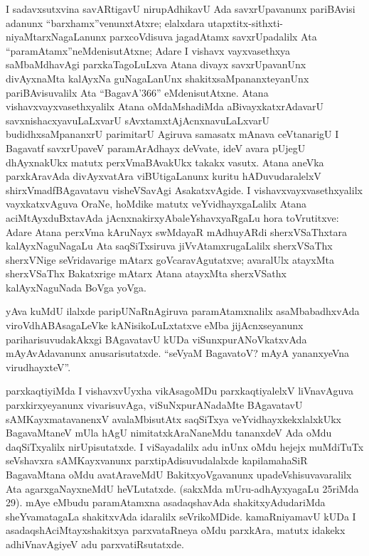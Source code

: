 I sadavxsutxvina savARtigavU nirupAdhikavU Ada savxrUpavanunx pariBAvisi adanunx ``barxhamx''venunxtAtxre; elalxdara utapxtitx-sithxti-niyaMtarxNagaLanunx parxcoVdisuva jagadAtamx savxrUpadalilx Ata ``paramAtamx''neMdenisutAtxne; Adare I vishavx vayxvasethxya saMbaMdhavAgi parxkaTagoLuLxva Atana divayx savxrUpavanUnx divAyxnaMta kalAyxNa guNagaLanUnx shakitxsaMpananxteyanUnx pariBAvisuvalilx Ata ``BagavA\char'366'' eMdenisutAtxne. Atana vishavxvayxvasethxyalilx Atana oMdaMshadiMda aBivayxkatxrAdavarU savxnishacxyavuLaLxvarU sAvxtamxtAjAcnxnavuLaLxvarU budidhxsaMpananxrU parimitarU Agiruva samasatx mAnava ceVtanarigU I Bagavatf savxrUpaveV paramArAdhayx deVvate, ideV avara pUjegU dhAyxnakUkx matutx perxVmaBAvakUkx takakx vasutx. Atana aneVka parxkAravAda divAyxvatAra viBUtigaLanunx kuritu hADuvudaralelxV shirxVmadfBAgavatavu visheVSavAgi AsakatxvAgide. I vishavxvayxvasethxyalilx vayxkatxvAguva OraNe, hoMdike matutx veYvidhayxgaLalilx Atana aciMtAyxduBxtavAda jAcnxnakirxyAbaleYshavxyaRgaLu hora toVrutitxve: Adare Atana perxVma kAruNayx swMdayaR mAdhuyARdi sherxVSaThxtara kalAyxNaguNagaLu Ata saqSiTxsiruva jiVvAtamxrugaLalilx sherxVSaThx sherxVNige seVridavarige mAtarx goVcaravAgutatxve; avaralUlx atayxMta sherxVSaThx Bakatxrige mAtarx Atana atayxMta sherxVSathx kalAyxNaguNada BoVga yoVga.

yAva kuMdU ilalxde paripUNaRnAgiruva paramAtamxnalilx asaMbabadhxvAda viroVdhABAsagaLeVke kANisikoLuLxtatxve eMba jijAcnxseyanunx pariharisuvudakAkxgi BAgavatavU kUDa viSunxpurANoVkatxvAda mAyAvAdavanunx anusarisutatxde. ``seVyaM BagavatoV? mAyA yananxyeVna virudhayxteV''.

parxkaqtiyiMda I vishavxvUyxha vikAsagoMDu parxkaqtiyalelxV liVnavAguva parxkirxye\-yanunx vivarisuvAga, viSuNxpurANadaMte BAgavatavU sAMKayxmatavanenxV avalaMbi\-sutAtx saqSiTxya veYvidhayxkekxlalxkUkx BagavaMtaneV mUla hAgU nimitatxkAraNaneMdu tananxdeV Ada oMdu daqSiTxyalilx nirUpisutatxde. I viSayadalilx adu inUnx oMdu hejejx muMdiTuTx seVshavxra sAMKayxvanunx parxtipAdisuvudalalxde kapilamahaSiR BagavaMtana oMdu avatAraveMdU BakitxyoVgavanunx upadeVshisuvavaralilx Ata agarxgaNayxneMdU heVLutatxde. (sakxMda mUru-adhAyxyagaLu 25riMda 29). mAye eMbudu paramAtamxna asadaqshavAda shakitxyAdudariMda sheYvamatagaLa shakitxvAda idaralilx seVrikoMDide. kamaRniyamavU kUDa I asadaqshAciMtayxshakitxya parxvataRneya oMdu parxkAra, matutx idakekx adhiVnavAgiyeV adu parxvatiRsutatxde.

